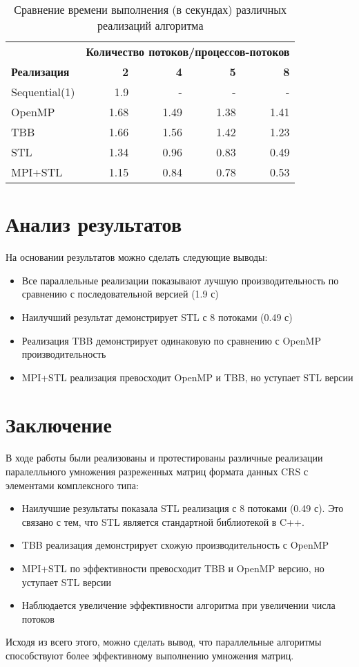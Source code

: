 \documentclass[14pt,a4paper]{extarticle}
\begin{document}
\begin{table}[H]
\centering
\caption{Сравнение времени выполнения (в секундах) различных реализаций алгоритма}
\label{tab:performance}
\begin{tabular}{lrrrr}
\toprule
& \multicolumn{4}{c}{\textbf{Количество потоков/процессов-потоков}} \\
\cmidrule(lr){2-5}
\textbf{Реализация} & \textbf{2} & \textbf{4} & \textbf{5} & \textbf{8} \\
\midrule
Sequential(1) & 1.9 & - & - & - \\
OpenMP & 1.68 & 1.49 & 1.38 & 1.41 \\
TBB & 1.66 & 1.56 & 1.42 & 1.23 \\
STL & 1.34 & 0.96 & 0.83 & 0.49 \\
MPI+STL & 1.15 & 0.84 & 0.78 & 0.53 \\
\bottomrule
\end{tabular}
\end{table}

\section{Анализ результатов}

На основании результатов можно сделать следующие выводы:

\begin{itemize}
    \item Все параллельные реализации показывают лучшую производительность по сравнению с последовательной версией (1.9 с)
    \item Наилучший результат демонстрирует STL с 8 потоками (0.49 с)
    \item Реализация TBB демонстрирует одинаковую по сравнению с OpenMP производительность
    \item MPI+STL реализация превосходит OpenMP и TBB, но уступает STL версии
\end{itemize}

\newpage
\section{Заключение}

В ходе работы были реализованы и протестированы различные реализации паралелльного умножения разреженных матриц формата данных CRS с элементами комплексного типа:

\begin{itemize}
    \item Наилучшие результаты показала STL реализация с 8 потоками (0.49 с). Это связано с тем, что STL является стандартной библиотекой в C++.
    \item TBB реализация демонстрирует схожую производительность с OpenMP
    \item MPI+STL по эффективности превосходит TBB и OpenMP версию, но уступает STL версии
    \item Наблюдается увеличение эффективности алгоритма при увеличении числа потоков
\end{itemize}

Исходя из всего этого, можно сделать вывод, что параллельные алгоритмы способствуют более эффективному выполнению умножения матриц.
\end{document}
